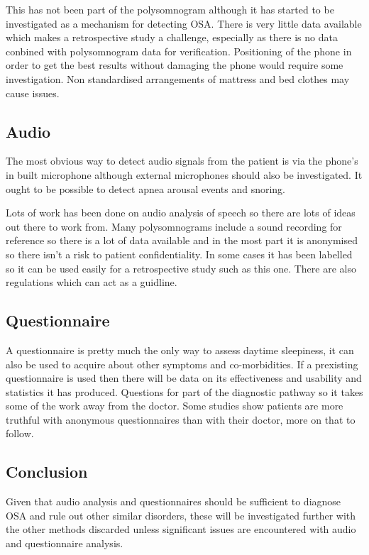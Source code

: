 This has not been part of the polysomnogram although it has started to be investigated as a mechanism for detecting OSA. There is very little data available which makes a retrospective study a challenge, especially as there is no data conbined with polysomnogram data for verification. Positioning of the phone in order to get the best results without damaging the phone would require some investigation. Non standardised arrangements of mattress and bed clothes may cause issues. 

\subsection{Audio}
The most obvious way to detect audio signals from the patient is via the phone’s in built microphone although external microphones should also be investigated. It ought to be possible to detect apnea arousal events and snoring. 

Lots of work has been done on audio analysis of speech so there are lots of ideas out there to work from. Many polysomnograms include a sound recording for reference so there is a lot of data available and in the most part it is anonymised so there isn’t a risk to patient confidentiality. In some cases it has been labelled so it can be used easily for a retrospective study such as this one. There are also regulations which can act as a guidline. 

\subsection{Questionnaire}
A questionnaire is pretty much the only way to assess daytime sleepiness, it can also be used to acquire about other symptoms and co-morbidities. If a prexisting questionnaire is used then there will be data on its effectiveness and usability and statistics it has produced. Questions for part of the diagnostic pathway so it takes some of the work away from the doctor. Some studies show patients are more truthful with anonymous questionnaires than with their doctor, more on that to follow.

\subsection{Conclusion}
Given that audio analysis and questionnaires should be sufficient to diagnose OSA and rule out other similar disorders, these will be investigated further with the other methods discarded unless significant issues are encountered with audio and questionnaire analysis.
